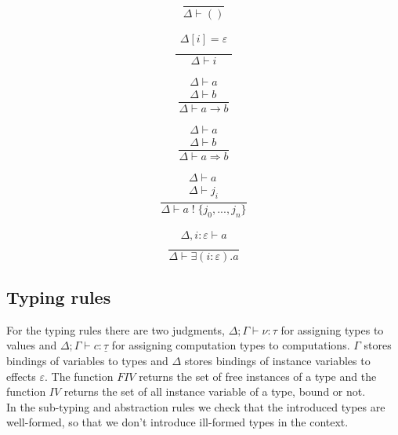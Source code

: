 \documentclass[12pt]{article}
\newcommand\eff[0]{\varepsilon}
\newcommand\ty[0]{\tau}
\newcommand\tunit[0]{()}
\newcommand\tarr[2]{#1 \rightarrow #2}
\newcommand\thandler[2]{#1 \Rightarrow #2}
\newcommand\cty[0]{\underline{\ty}}
\newcommand\aty[2]{#1 \; ! \; #2}
\newcommand\texists[3]{\exists(#1:#2) . #3}
\newcommand\val[0]{\nu}
\newcommand\comp[0]{c}
\begin{document}
\begin{minipage}{0.25\textwidth}
\[\frac{
	\begin{array}{l}
	\end{array}
}{
	\Delta \vdash \tunit
}\]
\end{minipage}
\begin{minipage}{0.25\textwidth}
\[\frac{
	\begin{array}{l}
	\Delta[i] = \eff  \\
	\end{array}
}{
	\Delta \vdash i
}\]
\end{minipage}
\begin{minipage}{0.25\textwidth}
\[\frac{
	\begin{array}{l}
	\Delta \vdash a  \\
	\Delta \vdash b
	\end{array}
}{
	\Delta \vdash \tarr{a}{b}
}\]
\end{minipage}
\begin{minipage}{0.25\textwidth}
\[\frac{
	\begin{array}{l}
	\Delta \vdash a  \\
	\Delta \vdash b
	\end{array}
}{
	\Delta \vdash \thandler{a}{b}
}\]
\end{minipage}
\begin{minipage}{0.5\textwidth}
\[\frac{
	\begin{array}{l}
	\Delta \vdash a  \\
	\Delta \vdash j_i
	\end{array}
}{
	\Delta \vdash \aty{a}{\{ j_0, ..., j_n \}}
}\]
\end{minipage}
\begin{minipage}{0.5\textwidth}
\[\frac{
	\begin{array}{l}
	\Delta , i : \eff \vdash a  \\
	\end{array}
}{
	\Delta \vdash \texists{i}{\eff}{a}
}\]
\end{minipage}

\newpage
\subsection{Typing rules}
For the typing rules there are two judgments,
$\Delta;\Gamma \vdash \val : \ty$ for assigning types to values and $\Delta;\Gamma \vdash \comp : \cty$ for assigning computation types to computations. $\Gamma$ stores bindings of variables to types and $\Delta$ stores bindings of instance variables to effects $\eff$.  The function $FIV$ returns the set of free instances of a type and the function $IV$ returns the set of all instance variable of a type, bound or not. \\
In the sub-typing and abstraction rules we check that the introduced types are well-formed, so that we don't introduce ill-formed types in the context.
\end{document}
